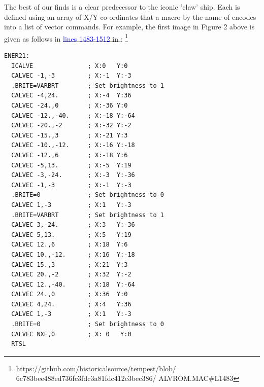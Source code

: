 \vspace{-0.5cm}
The best of our finds is a clear predecessor to the iconic 'claw' ship. Each is defined
using an array of X/Y co-ordinates that a macro by the name of  encodes into a list
of vector commands. For example, the first image in Figure 2 above is given as follows in
\href{https://github.com/historicalsource/tempest/blob/6c783bee488ed736fc3fdc3a81fdc412c3bec386/ALVROM.MAC#L1483}{\textcolor{blue}{lines 1483-1512} in }:
\footnote{https://github.com/historicalsource/tempest/blob/
6c783bee488ed736fc3fdc3a81fdc412c3bec386/
ALVROM.MAC\#L1483}
\begin{lstlisting}
ENER21:
  ICALVE               ; X:0   Y:0     
  CALVEC -1,-3         ; X:-1  Y:-3     
  .BRITE=VARBRT        ; Set brightness to 1
  CALVEC -4,24.        ; X:-4  Y:36
  CALVEC -24.,0        ; X:-36 Y:0
  CALVEC -12.,-40.     ; X:-18 Y:-64
  CALVEC -20.,-2       ; X:-32 Y:-2
  CALVEC -15.,3        ; X:-21 Y:3
  CALVEC -10.,-12.     ; X:-16 Y:-18
  CALVEC -12.,6        ; X:-18 Y:6
  CALVEC -5,13.        ; X:-5  Y:19
  CALVEC -3,-24.       ; X:-3  Y:-36
  CALVEC -1,-3         ; X:-1  Y:-3
  .BRITE=0             ; Set brightness to 0 
  CALVEC 1,-3          ; X:1   Y:-3
  .BRITE=VARBRT        ; Set brightness to 1 
  CALVEC 3,-24.        ; X:3   Y:-36
  CALVEC 5,13.         ; X:5   Y:19
  CALVEC 12.,6         ; X:18  Y:6
  CALVEC 10.,-12.      ; X:16  Y:-18
  CALVEC 15.,3         ; X:21  Y:3
  CALVEC 20.,-2        ; X:32  Y:-2
  CALVEC 12.,-40.      ; X:18  Y:-64
  CALVEC 24.,0         ; X:36  Y:0
  CALVEC 4,24.         ; X:4   Y:36
  CALVEC 1,-3          ; X:1   Y:-3
  .BRITE=0             ; Set brightness to 0 
  CALVEC NXE,0         ; X: 0   Y:0     
  RTSL
\end{lstlisting}

